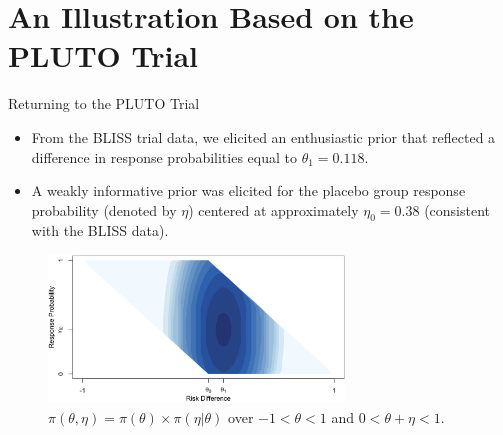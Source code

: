 \documentclass{beamer}
\begin{document}
\section{An Illustration Based on the PLUTO Trial}
\begin{frame}{Returning to the PLUTO Trial}
\begin{itemize}
	  \item From the BLISS trial data, we elicited an enthusiastic prior that reflected a 
	    	  difference in response probabilities equal to $\theta_1=0.118$.
		
		\vspace{0.2cm}	
		\item A weakly informative prior was elicited for the placebo group response probability (denoted by $\eta$) centered
		      at approximately $\eta_0=0.38$ (consistent with the BLISS data). 
\end{itemize}

\vspace{-0.1cm}
\begin{figure}[htbp]
\begin{center}
\includegraphics[width=0.7\textwidth]{./figures/enth_aug12.png}
\caption{$\pi(\theta,\eta)=\pi(\theta)\times\pi(\eta|\theta)$ over $-1<\theta<1$ and $0<\theta+\eta<1$.}
\label{fig:figure5}
 \end{center}
\end{figure}

\end{frame}





\end{document}
